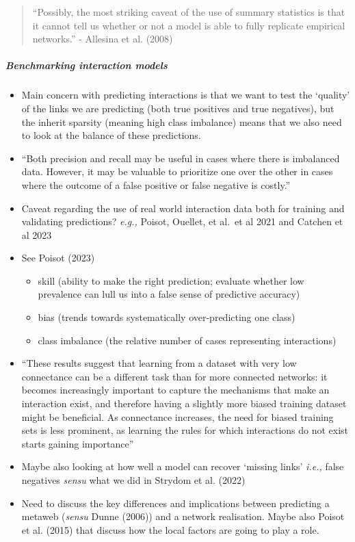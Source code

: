 \documentclass[
]{article}
\let\oldsubparagraph\subparagraph
\renewcommand{\subparagraph}[1]{\oldsubparagraph{#1}\mbox{}}
\begin{document}
\begin{quote}
``Possibly, the most striking caveat of the use of summary statistics is
that it cannot tell us whether or not a model is able to fully replicate
empirical networks.'' - Allesina et al. (2008)
\end{quote}

\subparagraph{Benchmarking interaction
models}\label{benchmarking-interaction-models}

\begin{itemize}
\item
  Main concern with predicting interactions is that we want to test the
  `quality' of the links we are predicting (both true positives and true
  negatives), but the inherit sparsity (meaning high class imbalance)
  means that we also need to look at the balance of these predictions.
\item
  ``Both precision and recall may be useful in cases where there is
  imbalanced data. However, it may be valuable to prioritize one over
  the other in cases where the outcome of a false positive or false
  negative is costly.''
\item
  Caveat regarding the use of real world interaction data both for
  training and validating predictions? \emph{e.g.,} Poisot, Ouellet, et
  al.~et al 2021 and Catchen et al 2023
\item
  See Poisot (2023)

  \begin{itemize}
  \item
    skill (ability to make the right prediction; evaluate whether low
    prevalence can lull us into a false sense of predictive accuracy)
  \item
    bias (trends towards systematically over-predicting one class)
  \item
    class imbalance (the relative number of cases representing
    interactions)
  \end{itemize}
\item
  ``These results suggest that learning from a dataset with very low
  connectance can be a different task than for more connected networks:
  it becomes increasingly important to capture the mechanisms that make
  an interaction exist, and therefore having a slightly more biased
  training dataset might be beneficial. As connectance increases, the
  need for biased training sets is less prominent, as learning the rules
  for which interactions do not exist starts gaining importance''
\item
  Maybe also looking at how well a model can recover `missing links'
  \emph{i.e.,} false negatives \emph{sensu} what we did in Strydom et
  al. (2022)
\item
  Need to discuss the key differences and implications between
  predicting a metaweb (\emph{sensu} Dunne (2006)) and a network
  realisation. Maybe also Poisot et al. (2015) that discuss how the
  local factors are going to play a role.
\end{itemize}
\end{document}
